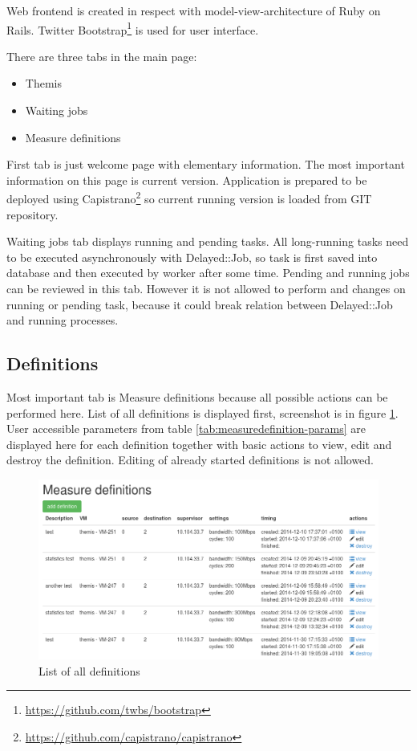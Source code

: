 Web frontend is created in respect with model-view-architecture of Ruby on Rails. Twitter Bootstrap\footnote{\url{https://github.com/twbs/bootstrap}} is used for user interface.

There are three tabs in the main page:
	\begin{itemize}
		\item Themis
		\item Waiting jobs
		\item Measure definitions
	\end{itemize}

First tab is just welcome page with elementary information. The most important information on this page is current version. Application is prepared to be deployed using Capistrano\footnote{\url{https://github.com/capistrano/capistrano}} so current running version is loaded from GIT repository.

Waiting jobs tab displays running and pending tasks. All long-running tasks need to be executed asynchronously with Delayed::Job, so task is first saved into database and then executed by worker after some time. Pending and running jobs can be reviewed in this tab. However it is not allowed to perform and changes on running or pending task, because it could break relation between Delayed::Job and running processes.

\subsection{Definitions}
Most important tab is Measure definitions because all possible actions can be performed here. List of all definitions is displayed first, screenshot is in figure \ref{img:themis-definitions}. User accessible parameters from table \ref{tab:measuredefinition-params} are displayed here for each definition together with basic actions to view, edit and destroy the definition. Editing of already started definitions is not allowed.

\begin{figure}[htb]
	\begin{center}
	\includegraphics[width=\textwidth]{themis-definitions.png}
	\end{center}
	\caption{List of all definitions}
	\label{img:themis-definitions}
\end{figure}


